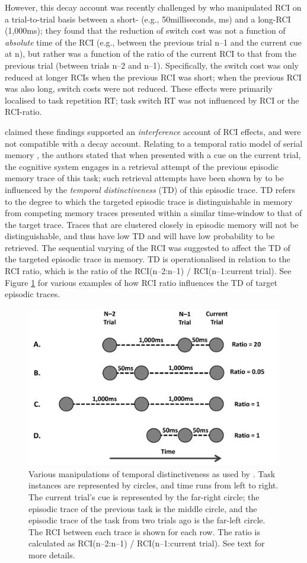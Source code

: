 \documentclass[a4paper, jou, natbib]{apa6}
\begin{document}
However, this decay account was recently challenged by \cite{Horoufchin2011a} who manipulated RCI on a trial-to-trial basis between a short- (e.g., 50milliseconds, ms) and a long-RCI (1,000ms); they found that the reduction of switch cost was not a function of \emph{absolute} time of the RCI (e.g., between the previous trial n--1 and the current cue at n), but rather was a function of the ratio of the current RCI to that from the previous trial (between trials n--2 and n--1). Specifically, the switch cost was only reduced at longer RCIs when the previous RCI was short; when the previous RCI was also long, switch costs were not reduced. These effects were primarily localised to task repetition RT; task switch RT was not influenced by RCI or the RCI-ratio.

\cite{Horoufchin2011a} claimed these findings supported an \emph{interference} account of RCI effects, and were not compatible with a decay account. Relating to a temporal ratio model of serial memory \citep[SIMPLE][]{Brown2007}, the authors stated that when presented with a cue on the current trial, the cognitive system engages in a retrieval attempt of the previous episodic memory trace of this task; such retrieval attempts have been shown by \cite{Brown2007} to be influenced by the \emph{temporal distinctiveness} (TD) of this episodic trace. TD refers to the degree to which the targeted episodic trace is distinguishable in memory from competing memory traces presented within a similar time-window to that of the target trace. Traces that are clustered closely in episodic memory will not be distinguishable, and thus have low TD and will have low probability to be retrieved. The sequential varying of the RCI was suggested to affect the TD of the targeted episodic trace in memory. TD is operationalised in relation to the RCI ratio, which is the ratio of the RCI(n--2:n--1) / RCI(n--1:current trial). See Figure \ref{fig:tdAccount} for various examples of how RCI ratio influences the TD of target episodic traces. 

\begin{figure} 
\begin{center}
\includegraphics[width = 0.5 \textwidth]{Images/tdAccount.pdf}
\caption{Various manipulations of temporal distinctiveness as used by \cite{Horoufchin2011, Horoufchin2011a}. Task instances are represented by circles, and time runs from left to right. The current trial's cue is represented by the far-right circle; the episodic trace of the previous task is the middle circle, and the episodic trace of the task from two trials ago is the far-left circle. The RCI between each trace is shown for each row. The ratio is calculated as RCI(n--2:n--1) / RCI(n--1:current trial). See text for more details.}
\label{fig:tdAccount}
\end{center}
\end{figure}
\end{document}
